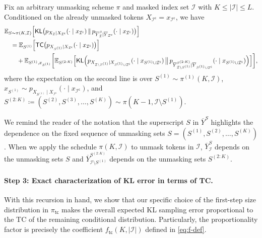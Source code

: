 \documentclass[english]{article}
\newcommand{\defn}{\coloneqq}
\newcommand{\cI}{\mathcal{I}}
\newcommand{\bE}{\mathbb{E}}
\newcommand{\KL}{\mathsf{KL}}
\newcommand{\ol}{\overline}
\newcommand{\setc}{\mathrm{c}}
\newcommand{\TC}{\mathsf{TC}}
\newcommand{\tc}{\mathsf{tc}}
\begin{document}
\begin{lemma}
    \label{prop:recursive}
Fix an arbitrary unmasking scheme $ \pi $ and masked index set $ \cI $ with $K\leq |\cI| \leq L $. 
Conditioned on the already unmasked tokens $ X_{\cI^\mathsf{c}} =x_{\cI^\mathsf{c}}$, we have
\begin{align*}
    & \bE_{S \sim \pi(K, \cI) } \Big[\KL\big(p_{X_{\cI}\mid X_{\cI^\mathsf{c}}}(\cdot \mid x_{\cI^\mathsf{c}})  \,\|\,  p_{\overline Y_{\cI}^S \mid \overline Y_{\cI^\setc}}(\cdot \mid x_{\cI^\mathsf{c}}  ) \big)\Big] \notag\\
    &\quad= 
    \bE_{S^{(1)}} \Big[ \TC \big(p_{X_{S^{(1)}} \mid X_{\cI^\mathsf{c}}}(\cdot\mid x_{\cI^\mathsf{c}}) \big) \Big] \\
     &\qquad
    +\bE_{S^{(1)},x_{S^{(1)}}} \bigg[\bE_{S^{(2:K)}} \Big[\KL \Big(p_{X_{\cI \setminus S^{(1)}} \mid X_{S^{(1)} \cup \cI^\mathsf{c}}}(\cdot \mid x_{S^{(1)} \cup \cI^\mathsf{c}}) \,\big\|\, p_{\overline Y_{\cI \setminus S^{(1)}}^{S^{(2:K)}}  \mid \overline Y_{S^{(1)} \cup \cI^\mathsf{c}}}(\cdot \mid x_{S^{(1)} \cup \cI^\mathsf{c}} ) \Big) \Big] \bigg] ,
\end{align*}
where the expectation on the second line is over $ S^{(1)} \sim \pi^{(1)}(K, \cI) $, $x_{S^{(1)}} \sim p_{X_{S^{(1)}} \mid X_{\cI^\mathsf{c}}}(\cdot \mid x_{\cI^\mathsf{c}})$, and $S^{(2:K)}\defn (S^{(2)}, S^{(3)}, \ldots, S^{(K)}) \sim \pi(K-1, \cI \setminus S^{(1)})$.
\end{lemma}
We remind the reader of the notation that the superscript $S$ in $\ol Y^S$ highlights the dependence on the fixed sequence of unmasking sets $S = (S^{(1)}, S^{(2)}, \ldots, S^{(K)})$. When we apply the schedule $\pi(K,\cI)$ to unmask tokens in $\cI$, $\overline Y_{\cI}^S$ depends on the unmasking sets $S$ and $\overline Y_{\cI \setminus S^{(1)}}^{S^{(2:K)}}$ depends on the unmasking sets $S^{(2:K)}$.

\paragraph{Step 3: Exact characterization of KL error in terms of TC.}
With this recursion in hand, we show that our specific choice of the first-step size distribution in $ \pi_{\tc}  $ makes the overall expected KL sampling error proportional to the TC of the remaining conditional distribution.
Particularly, the proportionality factor is precisely the coefficient $f_\tc(K, |\cI|)$ defined in \eqref{eq:f-def}.
\end{document}
